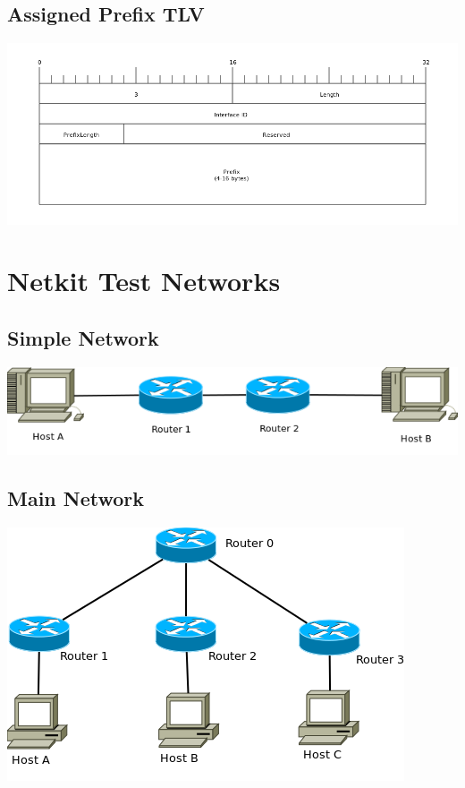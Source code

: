\section{Assigned Prefix TLV}
\begin{center}
	\includegraphics[width=\linewidth]{../Diagrams/Packets/assigned_prefix_tlv.png}
\end{center}

\chapter{Netkit Test Networks}

\section{Simple Network}
\begin{center}
	\includegraphics[width=\linewidth]{../Diagrams/Network/SimpleNetkit.png}
\end{center}

\section{Main Network}
\begin{center}
	\includegraphics[width=\linewidth]{../Diagrams/Network/MainNetkit.png}
\end{center}

